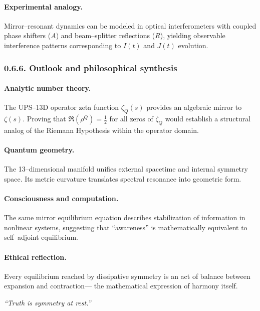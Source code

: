 \paragraph{Experimental analogy.}
Mirror–resonant dynamics can be modeled in optical interferometers with coupled phase shifters ($A$) and beam–splitter reflections ($R$),
yielding observable interference patterns corresponding to $I(t)$ and $J(t)$ evolution.

\subsubsection*{0.6.6. Outlook and philosophical synthesis}

\paragraph{Analytic number theory.}
The UPS–13D operator zeta function $\zeta_Q(s)$ provides an algebraic mirror to $\zeta(s)$.
Proving that $\Re(\rho^Q)=\tfrac12$ for all zeros of $\zeta_Q$ would establish a structural analog of the Riemann Hypothesis within the operator domain.

\paragraph{Quantum geometry.}
The 13–dimensional manifold unifies external spacetime and internal symmetry space.
Its metric curvature translates spectral resonance into geometric form.

\paragraph{Consciousness and computation.}
The same mirror equilibrium equation describes stabilization of information in nonlinear systems,
suggesting that “awareness” is mathematically equivalent to self–adjoint equilibrium.

\paragraph{Ethical reflection.}
Every equilibrium reached by dissipative symmetry is an act of balance between expansion and contraction—
the mathematical expression of harmony itself.

\begin{flushright}
\textit{“Truth is symmetry at rest.”}
\end{flushright}

